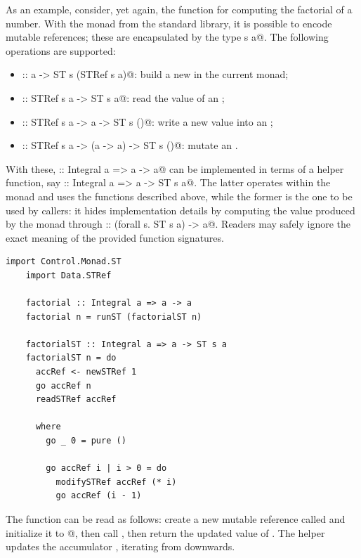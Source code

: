 \documentclass[UdineBachThesis,american,11pt]{PhdThesis}
\begin{document}
  As an example, consider, yet again, the function for computing the factorial
  of a number. With the \lstinline@ST@ monad from the standard library, it is
  possible to encode mutable references; these are encapsulated by the type
  \lstinline@STRef s a@. The following operations are supported:

  \begin{itemize}
    \item \lstinline@newSTRef :: a -> ST s (STRef s a)@: build a new
    \lstinline@STRef@ in the current \lstinline@ST@ monad;

    \item \lstinline@readSTRef :: STRef s a -> ST s a@: read the value of an
    \lstinline@STRef@;

    \item \lstinline@writeSTRef :: STRef s a -> a -> ST s ()@: write a new value
    into an \lstinline@STRef@;

    \item \lstinline@modifySTRef :: STRef s a -> (a -> a) -> ST s ()@: mutate an
    \lstinline@STRef@.
  \end{itemize}

  With these, \lstinline@factorial :: Integral a => a -> a@ can be implemented
  in terms of a helper function, say
  \lstinline@factorialST :: Integral a => a -> ST s a@. The latter operates
  within the \lstinline@ST@ monad and uses the functions described above, while
  the former is the one to be used by callers: it hides implementation details
  by computing the value produced by the \lstinline@ST@ monad through
  \lstinline@runST :: (forall s. ST s a) -> a@. Readers may safely ignore the
  exact meaning of the provided function signatures.

  \begin{lstlisting}[gobble=4,basicstyle=\ttfamily\small]
    import Control.Monad.ST
    import Data.STRef

    factorial :: Integral a => a -> a
    factorial n = runST (factorialST n)

    factorialST :: Integral a => a -> ST s a
    factorialST n = do
      accRef <- newSTRef 1
      go accRef n
      readSTRef accRef

      where
        go _ 0 = pure ()

        go accRef i | i > 0 = do
          modifySTRef accRef (* i)
          go accRef (i - 1)
  \end{lstlisting}

  The function \lstinline@factorialST@ can be read as follows: create a new
  mutable reference called \lstinline@accRef@ and initialize it to
  @, then call \lstinline@go@, then return the updated value of
  \lstinline@accRef@. The helper \lstinline@go@ updates the accumulator
  \lstinline@accRef@, iterating from \lstinline@n@ downwards.
\end{document}
